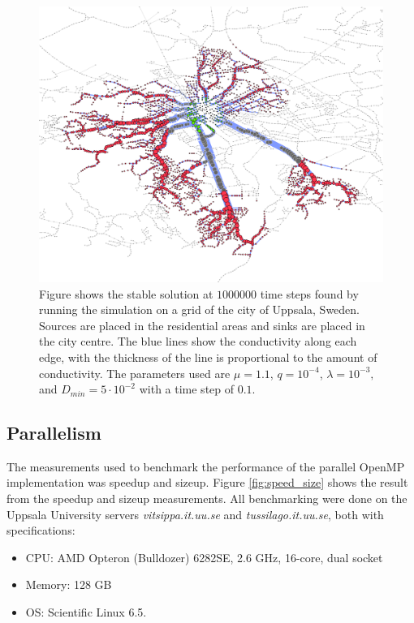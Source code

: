 \begin{figure}
\centering
\includegraphics[width=\textwidth]{img/uppsala.png}
\caption{Figure shows the stable solution at $1000000$ time steps found by running the simulation on a grid of the city of Uppsala, Sweden. Sources are placed in the residential areas and sinks are placed in the city centre. The blue lines show the conductivity along each edge, with the thickness of the line is proportional to the amount of conductivity. The parameters used are $\mu = 1.1$, $q = 10^{-4}$, $\lambda = 10^{-3},$ and $D_{min}=5 \cdot 10^{-2}$ with a time step of $0.1$.}
\label{fig:uppsala}
\end{figure}

\subsection{Parallelism}
The measurements used to benchmark the performance of the parallel OpenMP implementation was speedup and sizeup. Figure \ref{fig:speed_size} shows the result from the speedup and sizeup measurements. All benchmarking were done on the Uppsala University servers \textit{vitsippa.it.uu.se} and \textit{tussilago.it.uu.se}, both with specifications: 

\begin{itemize}
\item CPU: AMD Opteron (Bulldozer) 6282SE, 2.6 GHz, 16-core, dual socket
\item Memory: 128 GB
\item OS: Scientific Linux 6.5.
\end{itemize}

